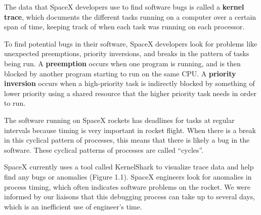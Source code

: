 \documentclass{hmcclinic}
\begin{document}
The data that SpaceX developers use to find software bugs is called
a {\bf kernel trace}, which documents the different tasks running on a computer over a
certain span of time, keeping track of when each task was running on each processor. 

To find potential bugs in their software, SpaceX developers look for
problems like unexpected preemptions, priority inversions, and breaks in the
pattern of tasks being run.
 A {\bf preemption} occurs when one program is running, and
is then blocked by another program starting to run on the same CPU. 
A {\bf priority
inversion} occurs when a high-priority task is indirectly blocked by something of
lower priority using a shared resource that the higher priority task needs in
order to run. 

The software running on SpaceX rockets has deadlines for tasks at regular intervals because timing is very important in rocket flight. When there is a break in this cyclical pattern of processes, this means that there is likely a bug in the software. These cyclical patterns of processes are called ``cycles''.

SpaceX currently uses a tool called KernelShark %
to visualize trace data and help find any bugs or anomalies (Figure 1.1). 
SpaceX engineers look for anomalies in process timing, which often indicates 
software problems on the rocket. We were informed by our liaisons that this
 debugging process can take up to several days, 
which is an inefficient use of engineer's time. \\
\end{document}
